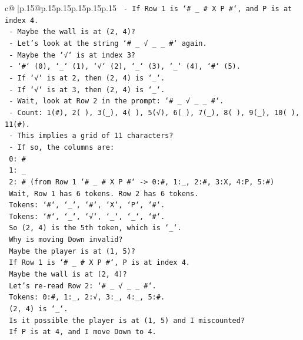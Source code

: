 \documentclass{article}
\begin{document}
{\begin{supertabular}{c@{$\;$}|p{.15\linewidth}@{}p{.15\linewidth}p{.15\linewidth}p{.15\linewidth}p{.15\linewidth}p{.15\linewidth}}
{{{\texttt{    {-} If Row 1 is `\# \_ \# X P \#`, and P is at index 4.} \\
\texttt{    {-} Maybe the wall is at (2, 4)?} \\
\texttt{    {-} Let's look at the string `\# \_ √ \_ \_ \#` again.} \\
\texttt{    {-} Maybe the `√` is at index 3?} \\
\texttt{    {-} `\#` (0), `\_` (1), `√` (2), `\_` (3), `\_` (4), `\#` (5).} \\
\texttt{    {-} If `√` is at 2, then (2, 4) is `\_`.} \\
\texttt{    {-} If `√` is at 3, then (2, 4) is `\_`.} \\
\texttt{    {-} Wait, look at Row 2 in the prompt: `\# \_ √ \_ \_ \#`.} \\
\texttt{    {-} Count: 1(\#), 2( ), 3(\_), 4( ), 5(√), 6( ), 7(\_), 8( ), 9(\_), 10( ), 11(\#).} \\
\texttt{    {-} This implies a grid of 11 characters?} \\
\texttt{    {-} If so, the columns are:} \\
\texttt{      0: \#} \\
\texttt{      1: \_} \\
\texttt{      2: \# (from Row 1 `\# \_ \# X P \#` {-}> 0:\#, 1:\_, 2:\#, 3:X, 4:P, 5:\#)} \\
\texttt{      Wait, Row 1 has 6 tokens. Row 2 has 6 tokens.} \\
\texttt{      Tokens: `\#`, `\_`, `\#`, `X`, `P`, `\#`.} \\
\texttt{      Tokens: `\#`, `\_`, `√`, `\_`, `\_`, `\#`.} \\
\texttt{      So (2, 4) is the 5th token, which is `\_`.} \\
\texttt{      Why is moving Down invalid?} \\
\texttt{      Maybe the player is at (1, 5)?} \\
\texttt{      If Row 1 is `\# \_ \# X P \#`, P is at index 4.} \\
\texttt{      Maybe the wall is at (2, 4)?} \\
\texttt{      Let's re{-}read Row 2: `\# \_ √ \_ \_ \#`.} \\
\texttt{      Tokens: 0:\#, 1:\_, 2:√, 3:\_, 4:\_, 5:\#.} \\
\texttt{      (2, 4) is `\_`.} \\
\texttt{      Is it possible the player is at (1, 5) and I miscounted?} \\
\texttt{      If P is at 4, and I move Down to 4.} \\
}}}
\end{supertabular}}
\end{document}
